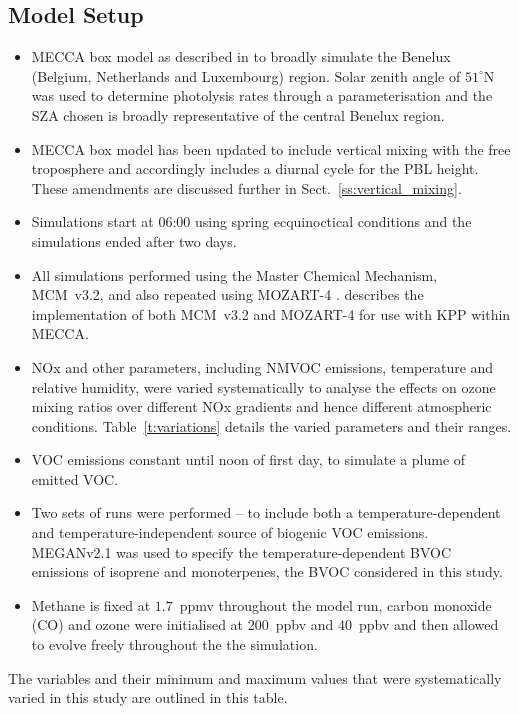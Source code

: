 \subsection{Model Setup} \label{ss:model_setup}
\begin{itemize}
    \item MECCA box model as described in \citet{Coates:2015} to broadly simulate the Benelux (Belgium, Netherlands and Luxembourg) region. Solar zenith angle of $51^{\circ}$N was used to determine photolysis rates through a parameterisation and the SZA chosen is broadly representative of the central Benelux region.
    \item MECCA box model has been updated to include vertical mixing with the free troposphere and accordingly includes a diurnal cycle for the PBL height. These amendments are discussed further in Sect.~\ref{ss:vertical_mixing}.
    \item Simulations start at 06:00 using spring ecquinoctical conditions and the simulations ended after two days.
    \item All simulations performed using the Master Chemical Mechanism, MCM~v3.2, \citep{MCM_Site} and also repeated using MOZART-4 \citep{Emmons:2010}. \citet{Coates:2015} describes the implementation of both MCM~v3.2 and MOZART-4 for use with KPP within MECCA.
    \item NOx and other parameters, including NMVOC emissions, temperature and relative humidity, were varied systematically to analyse the effects on ozone mixing ratios over different NOx gradients and hence different atmospheric conditions. Table~\ref{t:variations} details the varied parameters and their ranges.
    \item VOC emissions constant until noon of first day, to simulate a plume of emitted VOC.
    \item Two sets of runs were performed -- to include both a temperature-dependent and temperature-independent source of biogenic VOC emissions. MEGANv2.1 \citep{Guenther:2012} was used to specify the temperature-dependent BVOC emissions of isoprene and monoterpenes, the BVOC considered in this study. 
    \item Methane is fixed at $1.7$~ppmv throughout the model run, carbon monoxide (CO) and ozone were initialised at $200$~ppbv and $40$~ppbv and then allowed to evolve freely throughout the the simulation.
\end{itemize}
{%
    \renewcommand{\arraystretch}{1.1}%
    \begin{table}%
        \centering%
        \caption{The variables and their minimum and maximum values that were systematically varied in this study are outlined in this table.}%
        \label{t:variations}%
        
    \end{table}%
}

